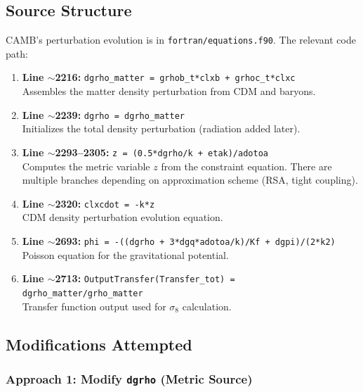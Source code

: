 \documentclass[11pt,letterpaper]{article}
\begin{document}
\subsection{Source Structure}

CAMB's perturbation evolution is in \texttt{fortran/equations.f90}. The relevant code path:

\begin{enumerate}
\item \textbf{Line $\sim$2216:} \texttt{dgrho\_matter = grhob\_t*clxb + grhoc\_t*clxc} \\
Assembles the matter density perturbation from CDM and baryons.

\item \textbf{Line $\sim$2239:} \texttt{dgrho = dgrho\_matter} \\
Initializes the total density perturbation (radiation added later).

\item \textbf{Line $\sim$2293--2305:} \texttt{z = (0.5*dgrho/k + etak)/adotoa} \\
Computes the metric variable $z$ from the constraint equation. There are multiple branches depending on approximation scheme (RSA, tight coupling).

\item \textbf{Line $\sim$2320:} \texttt{clxcdot = -k*z} \\
CDM density perturbation evolution equation.

\item \textbf{Line $\sim$2693:} \texttt{phi = -((dgrho + 3*dgq*adotoa/k)/Kf + dgpi)/(2*k2)} \\
Poisson equation for the gravitational potential.

\item \textbf{Line $\sim$2713:} \texttt{OutputTransfer(Transfer\_tot) = dgrho\_matter/grho\_matter} \\
Transfer function output used for $\sigma_8$ calculation.
\end{enumerate}

\subsection{Modifications Attempted}

\subsubsection{Approach 1: Modify \texttt{dgrho} (Metric Source)}
\end{document}
